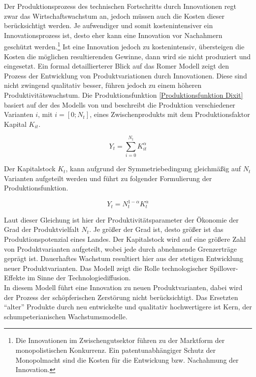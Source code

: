 Der Produktionsprozess des technischen Fortschritts durch Innovationen regt zwar das Wirtschaftswachstum an, jedoch m{\"u}ssen auch die Kosten dieser ber{\"u}cksichtigt werden. Je aufwendiger und somit kostenintensiver ein Innovationsprozess ist, desto eher kann eine Innovation vor Nachahmern gesch{\"u}tzt werden.\footnote{Die Innovationen im Zwischengutsektor führen zu der Marktform der monopolistischen Konkurrenz. Ein patentunabhängiger Schutz der Monopolmacht sind die Kosten für die Entwickung bzw. Nachahmung der Innovation.} Ist eine Innovation jedoch zu kostenintensiv, {\"u}bersteigen die Kosten die m{\"o}glichen resultierenden Gewinne, dann wird sie nicht produziert und eingesetzt. \newline Ein formal detaillierterer Blick auf das Romer Modell zeigt den Prozess der Entwicklung von Produktvariationen durch Innovationen. Diese sind nicht zwingend qualitativ besser, f{\"u}hren jedoch zu einem h{\"o}heren Produktivit{\"a}tswachstum. \newline Die Produktionsfunktion \eqref{Produktionsfunktion Dixit} basiert auf der des Modells von \citet{Dixit.1977} und beschreibt die Produktion verschiedener Varianten $i$, mit $i=[0;N_t]$, eines Zwischenprodukts mit dem Produktionsfaktor Kapital $K_{it}$.

	\begin{equation}
		Y_t= \sum_{i=0}^{N_t} K_{it}^\alpha 
	\end{equation}\label{Produktionsfunktion Dixit}


Der Kapitalstock $K_t$, kann aufgrund der Symmetriebedingung gleichm{\"a}{\ss}ig auf $N_t$ Varianten aufgeteilt werden und f{\"u}hrt zu folgender Formulierung der Produktionsfunktion.

	\begin{equation}
		Y_t=N_t^{1-\alpha}K_t^\alpha
	\end{equation}

Laut dieser Gleichung ist hier der Produktivit{\"a}tsparameter der {\"O}konomie der Grad der Produktvielfalt $N_t$. Je gr{\"o}{\ss}er der Grad ist, desto gr{\"o}{\ss}er ist das Produktionspotenzial eines Landes. Der Kapitalstock wird auf eine gr{\"o}{\ss}ere Zahl von Produktvarianten aufgeteilt, wobei jede durch abnehmende Grenzertr{\"a}ge gepr{\"a}gt ist. Dauerhaftes Wachstum resultiert hier aus der stetigen Entwicklung neuer Produktvarianten. Das Modell zeigt die Rolle technologischer Spillover-Effekte im Sinne der Technologiediffusion.\\


In diesem Modell führt eine Innovation zu neuen Produktvarianten, dabei wird der Prozess der sch{\"o}pferischen Zerst{\"o}rung nicht ber{\"u}cksichtigt. Das Ersetzten "`alter"' Produkte durch neu entwickelte und qualitativ hochwertigere ist Kern, der schumpeterianischen Wachstumsmodelle.

